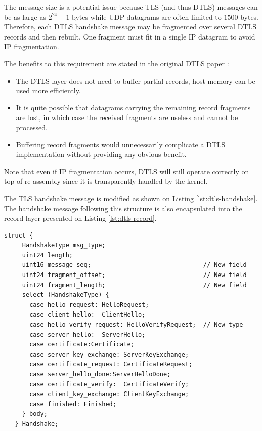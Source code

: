 The message size is a potential issue because TLS (and thus DTLS) messages can be as large as $2^{24}-1$ bytes while UDP datagrams are often limited to $1500$ bytes. Therefore, each DTLS handshake message may be fragmented over several DTLS records and then rebuilt. One fragment must fit in a single IP datagram to avoid IP fragmentation.

The benefits to this requirement are stated in the original DTLS paper \cite{modadugu2004design} :
\begin{itemize}
\item The DTLS layer does not need to buffer partial records, host memory can be used more efficiently.
\item It is quite possible that datagrams carrying the remaining record fragments are lost, in which case the received fragments are useless and cannot be processed.
\item Buffering record fragments would unnecessarily complicate a DTLS implementation without providing any obvious benefit.
\end{itemize}

Note that even if IP fragmentation occurs, DTLS will still operate correctly on top of re-assembly since it is transparently handled by the kernel.

The TLS handshake message is modified as shown on Listing \ref{lst:dtls-handshake}. The handshake message following this structure is also encapsulated into the record layer presented on Listing \ref{lst:dtls-record}.

\begin{lstlisting}[caption=DTLS handshake message, label=lst:dtls-handshake]
   struct {
     HandshakeType msg_type;
     uint24 length;
     uint16 message_seq;                               // New field
     uint24 fragment_offset;                           // New field
     uint24 fragment_length;                           // New field
     select (HandshakeType) {
       case hello_request: HelloRequest;
       case client_hello:  ClientHello;
       case hello_verify_request: HelloVerifyRequest;  // New type
       case server_hello:  ServerHello;
       case certificate:Certificate;
       case server_key_exchange: ServerKeyExchange;
       case certificate_request: CertificateRequest;
       case server_hello_done:ServerHelloDone;
       case certificate_verify:  CertificateVerify;
       case client_key_exchange: ClientKeyExchange;
       case finished: Finished;
     } body;
   } Handshake;
\end{lstlisting}

